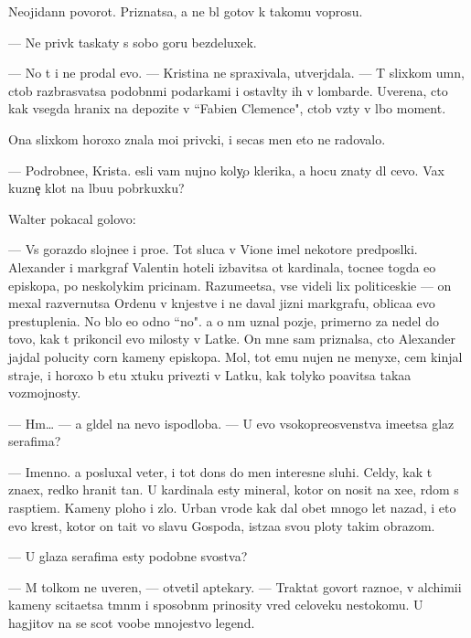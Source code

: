\documentclass[10pt]{book}
\begin{document}
Neojidann{\yi}{\y} povorot. Priznatsa, {\y}a ne b{\yi}l gotov k takomu voprosu.

— Ne priv{\yi}k taskaty s sobo{\y} goru bezdeluxek.

— No t{\yi} i ne prodal {\y}evo. — Kristina ne spraxivala, utverjdala. — T{\yi} slixkom um{\e}n, ctob{\yi} razbras{\yi}vatsa podobn{\yi}mi podarkami i ostavl{\ia}ty ih v lombarde. Uve\-re\-na, cto kak vsegda hranix na depozite v ``Fabien Clemence", ctob{\yi} vz{\ia}ty v l{\io}bo{\y} moment.

Ona slixkom horoxo znala mo{\y}i priv{\yi}cki, i se{\y}cas men{\ia} eto ne radovalo.

— Podrobne{\y}e, Krista. {\Y}esli vam nujno koly{\c}o klerika, {\y}a hocu znaty dl{\ia} cevo. Vax kuzne{\c} kl{\io}{\y}ot na l{\io}bu{\y}u pobr{\ia}kuxku?

Walter pokacal go\-lo\-vo{\y}:

— Vs{\e} gorazdo slojne{\y}e i pro{\x}e. Tot sluca{\y} v Vione imel nekotor{\yi}{\y}e pred\-pos{\yi}l\-ki. Alexander i markgraf Valentin hoteli izbavitsa ot kardinala, tocne{\y}e togda {\y}e{\x}o episkopa, po neskolykim pricinam. Razume{\y}etsa, vse videli lix politiceski{\y}e — on mexal razvernutsa Ordenu v kn{\ia}jestve i ne daval jizni markgrafu, oblica{\y}a {\y}evo prestupleni{\y}a. No b{\yi}lo {\y}e{\x}o odno ``no". {\Y}a o n{\e}m uznal pozje, primerno za nedel{\io} do tovo, kak t{\yi} prikoncil {\y}evo milosty v Latke. On mne sam priznalsa, cto Alexander jajdal polucity corn{\yi}{\y} kameny episkopa. Mol, tot {\y}emu nujen ne menyxe, cem kinjal{\yi} straje{\y}, i horoxo b{\yi} etu xtuku privezti v Latku, kak tolyko po{\y}avitsa taka{\y}a vozmojnosty.

— Hm… — {\Y}a gl{\ia}del na nevo ispodlob{\y}a. — U {\y}evo v{\yi}soko\-preosv{\ia}{\x}en\-st\-va ime\-{\y}et\-sa glaz serafima?

— Imenno. {\Y}a posluxal veter, i tot don{\e}s do men{\ia} interesn{\yi}{\y}e sluhi. Cel{\ia}dy, kak t{\yi} zna\-{\y}ex, redko hranit ta{\y}n{\yi}. U kardinala {\y}esty mineral, kotor{\yi}{\y} on nosit na xe{\y}e, r{\ia}dom s rasp{\ia}ti{\y}em. Kameny ploho{\y} i zlo{\y}. Urban vrode kak dal obet mnogo let nazad, i eto {\y}evo krest, kotor{\yi}{\y} on ta{\x}it vo slavu Gospoda, ist{\ia}za{\y}a svo{\y}u ploty takim obrazom.

— U glaza serafima {\y}esty podobn{\yi}{\y}e svo{\y}stva?

— M{\yi} tolkom ne uveren{\yi}, — otvetil aptekary. — Traktat{\yi} govor{\ia}t razno{\y}e, v alchimi{\y}i kameny scita{\y}etsa t{\e}mn{\yi}m i sposobn{\yi}m prinosity vred celoveku ne\-sto{\y}\-ko\-mu. U hagjitov na se{\y} scot voob{\x}e mnojestvo legend.
\end{document}
